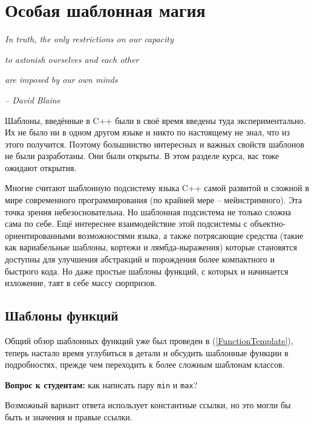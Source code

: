 \documentclass[a4paper,12pt,oneside]{book}
\newif\ifanswers
\begin{document}
\pagebreak
\chapter{Особая шаблонная магия}\label{chap:templates}

\hfill\textit{In truth, the only restrictions on our capacity}

\hfill\textit{to astonish ourselves and each other}

\hfill\textit{are imposed by our own minds}{\vspace{0.5em}}

\hfill\textit{-- David Blaine}

Шаблоны, введённые в C++ были в своё время введены туда экспериментально. Их не было ни в одном другом языке и никто по настоящему не знал, что из этого получится. Поэтому большинство интересных и важных свойств шаблонов не были разработаны. Они были открыты. В этом разделе курса, вас тоже ожидают открытия.

Многие считают шаблонную подсистему языка C++ самой развитой и сложной в мире современного программирования (по крайней мере -- мейнстримного). Эта точка зрения небезосновательна. Но шаблонная подсистема не только сложна сама по себе. Ещё интереснее взаимодействие этой подсистемы с объектно-ориентированными возможностями языка, а также потрясающие средства (такие как вариабельные шаблоны, кортежи и лямбда-выражения) которые становятся доступны для улучшения абстракций и порождения более компактного и быстрого кода. Но даже простые шаблоны функций, с которых и начинается изложение, таят в себе массу сюрпризов.

\section{Шаблоны функций}\label{FunctionTemplates}

Общий обзор шаблонных функций уже был проведен в (\ref{FunctionTemplate}), теперь настало время углубиться в детали и обсудить шаблонные функции в подробностях, прежде чем переходить к более сложным шаблонам классов.

\textbf{Вопрос к студентам:} как написать пару \lstinline!min! и \lstinline!max!?

\ifanswers
Правильный ответ: вариантов много, один из них см. ниже:
\fi

Возможный вариант ответа использует константные ссылки, но это могли бы быть и значения и правые ссылки.
\end{document}
